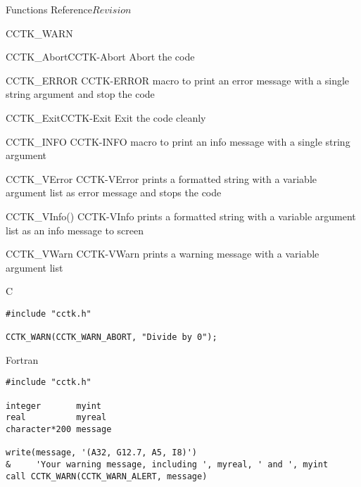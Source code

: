 \begin{cactuspart}{ Functions Reference}{}{$Revision$}
\begin{FunctionDescription}{CCTK\_WARN}
\begin{SeeAlsoSection}
\begin{SeeAlso2}{CCTK\_Abort}{CCTK-Abort}
Abort the code
\end{SeeAlso2}
\begin{SeeAlso2} {CCTK\_ERROR} {CCTK-ERROR}
macro to print an error message with a single string argument and stop
the code
\end{SeeAlso2}
\begin{SeeAlso2}{CCTK\_Exit}{CCTK-Exit}
Exit the code cleanly
\end{SeeAlso2}
\begin{SeeAlso2} {CCTK\_INFO} {CCTK-INFO}
macro to print an info message with a single string argument
\end{SeeAlso2}
\begin{SeeAlso2} {CCTK\_VError} {CCTK-VError}
prints a formatted string with a variable argument list as error
message and stops the code
\end{SeeAlso2}
\begin{SeeAlso2} {CCTK\_VInfo()} {CCTK-VInfo}
prints a formatted string with a variable argument list as an info message to
screen
\end{SeeAlso2}
\begin{SeeAlso2} {CCTK\_VWarn} {CCTK-VWarn}
prints a warning message with a variable argument list
\end{SeeAlso2}
\end{SeeAlsoSection}

\begin{ExampleSection}
\begin{Example}{C}
\begin{verbatim}
#include "cctk.h"

CCTK_WARN(CCTK_WARN_ABORT, "Divide by 0");
\end{verbatim}
\end{Example}
\begin{Example}{Fortran}
\begin{verbatim}
#include "cctk.h"

integer       myint
real          myreal
character*200 message

write(message, '(A32, G12.7, A5, I8)')
&     'Your warning message, including ', myreal, ' and ', myint
call CCTK_WARN(CCTK_WARN_ALERT, message)
\end{verbatim}
\end{Example}
\end{ExampleSection}
\end{FunctionDescription}


\end{cactuspart}
